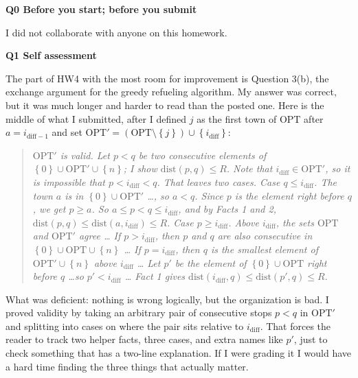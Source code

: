 \documentclass[11pt]{article}
\newcommand{\set}[1]{\left\{#1\right\}}
\newcommand{\OPT}{\mathrm{OPT}}
\newcommand{\qpage}[1]{\clearpage\noindent\textbf{\large #1}\par\medskip}
\begin{document}
\noindent\textbf{\large Q0 Before you start; before you submit}\par\medskip

I did not collaborate with anyone on this homework.

\qpage{Q1 Self assessment}

The part of HW4 with the most room for improvement is Question 3(b), the exchange argument for the greedy refueling algorithm.
My answer was correct, but it was much longer and harder to read than the posted one.
Here is the middle of what I submitted, after I defined $j$ as the first town of $\OPT$ after $a = i_{\text{diff}-1}$ and set $\OPT' = (\OPT \setminus \set{j}) \cup \set{i_{\text{diff}}}$:

\begin{quote}\small\emph{
$\OPT'$ is valid.
Let $p < q$ be two consecutive elements of $\set{0} \cup \OPT' \cup \set{n}$; I show $\mathrm{dist}(p,q) \le R$.
Note that $i_{\text{diff}} \in \OPT'$, so it is impossible that $p < i_{\text{diff}} < q$.
That leaves two cases.
Case $q \le i_{\text{diff}}$. The town $a$ is in $\set{0}\cup\OPT'$ \ldots, so $a < q$.
Since $p$ is the element right before $q$, we get $p \ge a$. So $a \le p < q \le i_{\text{diff}}$, and by Facts 1 and 2, $\mathrm{dist}(p,q) \le \mathrm{dist}(a,i_{\text{diff}}) \le R$.
Case $p \ge i_{\text{diff}}$. Above $i_{\text{diff}}$, the sets $\OPT$ and $\OPT'$ agree \ldots
If $p > i_{\text{diff}}$, then $p$ and $q$ are also consecutive in $\set{0}\cup\OPT\cup\set{n}$ \ldots
If $p = i_{\text{diff}}$, then $q$ is the smallest element of $\OPT' \cup \set{n}$ above $i_{\text{diff}}$ \ldots
Let $p'$ be the element of $\set{0}\cup\OPT$ right before $q$ \ldots so $p' < i_{\text{diff}}$ \ldots
Fact 1 gives $\mathrm{dist}(i_{\text{diff}},q) \le \mathrm{dist}(p',q) \le R$.}
\end{quote}

What was deficient: nothing is wrong logically, but the organization is bad.
I proved validity by taking an arbitrary pair of consecutive stops $p < q$ in $\OPT'$ and splitting into cases on where the pair sits relative to $i_{\text{diff}}$.
That forces the reader to track two helper facts, three cases, and extra names like $p'$, just to check something that has a two-line explanation.
If I were grading it I would have a hard time finding the three things that actually matter.
\end{document}
